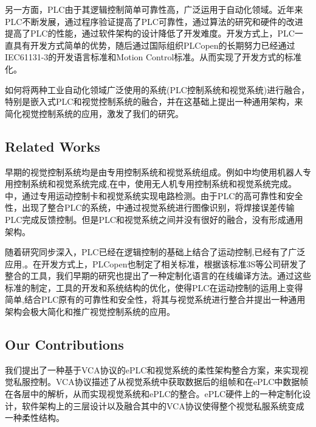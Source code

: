 \documentclass[journal,UTF8]{IEEEtran}
\begin{document}
另一方面，PLC由于其逻辑控制简单可靠性高，广泛运用于自动化领域\cite{Hossain2014Advanced}。近年来PLC不断发展，通过程序验证提高了PLC可靠性\cite{Obermeier2015A,Adiego2015Applying}，通过算法的研究和硬件的改进提高了PLC的性能\cite{Gerk2006Advanced,Hajduk2015Architecture}，通过软件架构的设计降低了开发难度\cite{Wua}。开发方式上，PLC一直具有开发方式简单的优势，随后通过国际组织PLCopen的长期努力已经通过IEC61131-3的开发语言标准和Motion Control标准。从而实现了开发方式的标准化。


如何将两种工业自动化领域广泛使用的系统(PLC控制系统和视觉系统)进行融合，特别是嵌入式PLC和视觉控制系统的融合，并在这基础上提出一种通用架构，来简化视觉控制系统的应用，激发了我们的研究。





\subsection{Related Works}

早期的视觉控制系统均是由专用控制系统和视觉系统组成。例如\cite{Wu2013Cloud,Tsai2017A}中均使用机器人专用控制系统和视觉系统完成,在\cite{Guenard2010A,Serra2016Landing}中，使用无人机专用控制系统和视觉系统完成。\cite{Nian2005An}中，通过专用运动控制卡和视觉系统实现电路检测。由于PLC的高可靠性和安全性，出现了整合PLC的系统，\cite{Chen2014A}中通过视觉系统进行图像识别，将焊接误差传输PLC完成反馈控制。但是PLC和视觉系统之间并没有很好的融合，没有形成通用架构。

随着研究同步深入，PLC已经在逻辑控制的基础上结合了运动控制,已经有了广泛应用\cite{Ioannides2004Design,Shi2016The,Fang2017Design},\cite{Ioannides2004Design,syaichu2011model}。在开发方式上，PLCopen也制定了相关标准\cite{S2006Advanced}，根据该标准3S等公司研发了整合的工具\cite{3S2017Logic}，我们早期的研究\cite{Wua}也提出了一种定制化语言的在线编译方法。通过这些标准的制定，工具的开发和系统结构的优化，使得PLC在运动控制的运用上变得简单,结合PLC原有的可靠性和安全性\cite{Chen2014A}，将其与视觉系统进行整合并提出一种通用架构会极大简化和推广视觉控制系统的应用。

\subsection{Our Contributions}
我们提出了一种基于VCA协议的ePLC和视觉系统的柔性架构整合方案，来实现视觉私服控制。VCA协议描述了从视觉系统中获取数据后的组帧和在ePLC中数据帧在各层中的解析，从而实现视觉系统和ePLC的整合。ePLC硬件上的一种定制化设计，软件架构上的三层设计以及融合其中的VCA协议使得整个视觉私服系统变成一种柔性结构。
\end{document}
